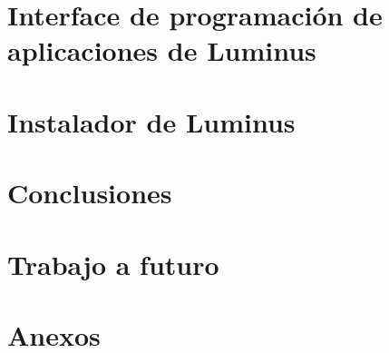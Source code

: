 \documentclass[10pt]{book}
\begin{document}
	\chapter{Interface de programación de aplicaciones de Luminus}\label{cap:Cap4.2}
	
	\chapter{Instalador de Luminus}\label{cap:Cap5}
	
	
	\chapter{Conclusiones}
	\chapter{Trabajo a futuro} \label{futurolol}
	\label{referencias}
	\chapter{Anexos} 
	\label{anexoa}
	\label{anexob}
\end{document}
